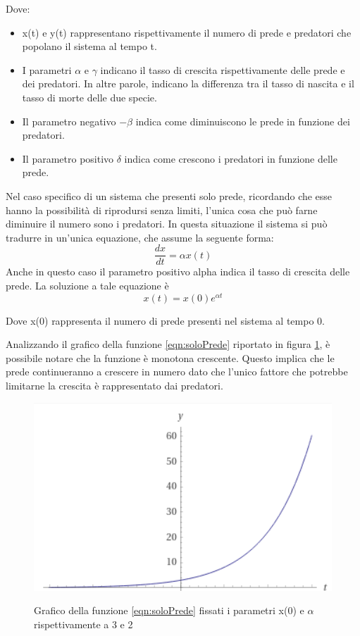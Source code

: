 \documentclass[11pt]{article}
\begin{document}
Dove: 
\begin{itemize}
    \item x(t) e y(t) rappresentano rispettivamente il numero di prede e predatori che popolano il sistema al tempo t.
    \item I parametri $\alpha$ e $\gamma$ indicano il tasso di crescita rispettivamente delle prede e dei predatori. In altre parole, indicano la differenza tra il tasso di nascita e il tasso di morte delle due specie.
    \item Il parametro negativo $-\beta$ indica come diminuiscono le prede in funzione dei predatori.
    \item Il parametro positivo $\delta$ indica come crescono i predatori in funzione delle prede. 
\end{itemize}

\noindent Nel caso specifico di un sistema che presenti solo prede, ricordando che esse hanno la possibilità di riprodursi senza limiti, l'unica cosa che può farne diminuire il numero sono i predatori.  
In questa situazione il sistema si può tradurre in un'unica equazione, che assume la seguente forma: 
\[
    \frac{dx}{dt} = \alpha x(t) 
\]
Anche in questo caso il parametro positivo alpha indica il tasso di crescita delle prede. 
La soluzione a tale equazione è 
\begin{equation}\label{eqn:soloPrede}
    x(t) = x(0)e^{\alpha t}
\end{equation}

\noindent Dove x(0) rappresenta il numero di prede presenti nel sistema al tempo 0.

\noindent Analizzando il grafico della funzione \eqref{eqn:soloPrede} riportato in figura \ref{figPlotLotkaVolterraSoloPrede}, è possibile notare che la funzione è monotona crescente. Questo implica che le prede continueranno a crescere in numero dato che l'unico fattore che potrebbe limitarne la crescita è rappresentato dai predatori. 

\begin{figure}[h]
    \centering
    \includegraphics[scale = 1]{plotSoloPrede.PNG}
    \label{figPlotLotkaVolterraSoloPrede}
    \caption{Grafico della funzione \eqref{eqn:soloPrede} fissati i parametri x(0) e $\alpha$ rispettivamente a 3 e 2}
\end{figure}
\end{document}
